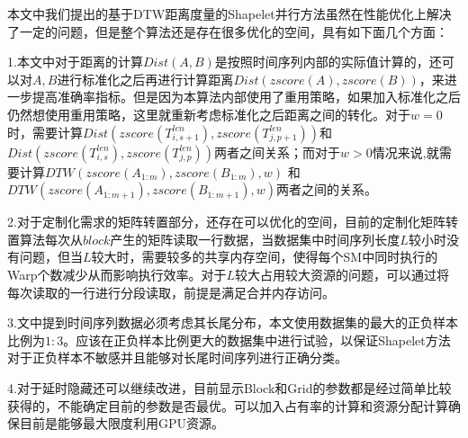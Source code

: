 本文中我们提出的基于DTW距离度量的Shapelet并行方法虽然在性能优化上解决了一定的问题，但是整个算法还是存在很多优化的空间，具有如下面几个方面：

1.本文中对于距离的计算$Dist(A,B)$是按照时间序列内部的实际值计算的，还可以对$A,B$进行标准化之后再进行计算距离$Dist(zscore(A),zscore(B))$，来进一步提高准确率指标。但是因为本算法内部使用了重用策略，如果加入标准化之后仍然想使用重用策略，这里就重新考虑标准化之后距离之间的转化。对于$w=0$时，需要计算$Dist(zscore(T_{i,s+1}^{len}),zscore(T_{j,p+1}^{len}))$和$Dist(zscore(T_{i,s}^{len}),zscore(T_{j,p}^{len}))$两者之间关系；而对于$w>0$情况来说,就需要计算$DTW(zscore(A_{1:m}),zscore(B_{1:m}),w)$ 和 $DTW(zscore(A_{1:m+1}),zscore(B_{1:m+1}),w)$两者之间的关系。

2.对于定制化需求的矩阵转置部分，还存在可以优化的空间，目前的定制化矩阵转置算法每次从$block$产生的矩阵读取一行数据，当数据集中时间序列长度$L$较小时没有问题，但当$L$较大时，需要较多的共享内存空间，使得每个SM中同时执行的Warp个数减少从而影响执行效率。对于$L$较大占用较大资源的问题，可以通过将每次读取的一行进行分段读取，前提是满足合并内存访问。

3.文中提到时间序列数据必须考虑其长尾分布，本文使用数据集的最大的正负样本比例为$1:3$。应该在正负样本比例更大的数据集中进行试验，以保证Shapelet方法对于正负样本不敏感并且能够对长尾时间序列进行正确分类。

4.对于延时隐藏还可以继续改进，目前显示Block和Grid的参数都是经过简单比较获得的，不能确定目前的参数是否最优。可以加入占有率的计算和资源分配计算确保目前是能够最大限度利用GPU资源。


